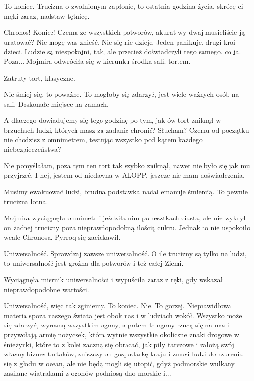\ds{} To koniec. Trucizna o zwolnionym zapłonie, to ostatnia godzina życia, skrócę ci męki zaraz, nadstaw tętnicę. \de{}

\ds{} Chronos! Koniec! Czemu ze wszystkich potworów, akurat wy dwaj musieliście ją uratować? Nie mogę was znieść. Nic się nie dzieje. 
Jeden panikuje, drugi kroi dzieci.
Ludzie są niespokojni, tak, ale przecież doświadczyli tego samego, co ja.
Poza... \dm{} Mojmira odwróciła się w kierunku środka sali. \dm{} tortem. \de{}

\ds{} Zatruty tort, klasyczne. \de{}

\ds{} Nie śmiej się, to poważne. To mogłoby się zdarzyć, jest wiele ważnych osób na sali. Doskonałe miejsce na zamach. \de{}

\ds{} A dlaczego dowiadujemy się tego godzinę po tym, jak ów tort zniknął w brzuchach ludzi, których masz za zadanie chronić? Słucham? 
Czemu od początku nie chodzisz z omnimetrem, testując wszystko pod kątem każdego niebezpieczeństwa? \de{}

\ds{} Nie pomyślałam, poza tym ten tort tak szybko zniknął, nawet nie było się jak mu przyjrzeć. 
I hej, jestem od niedawna w ALOPP, jeszcze nie mam doświadczenia. \de{}

\ds{} Musimy ewakuować ludzi, brudna podstawka nadal emanuje śmiercią. To pewnie trucizna lotna. \de{}

Mojmira wyciągnęła omnimetr i jeździła nim po resztkach ciasta, ale nie wykrył on żadnej trucizny poza nieprawdopodobną ilością cukru.
Jednak to nie uspokoiło wcale Chronosa. Pyrroq się zaciekawił.

\ds{} Uniwersalność. Sprawdzaj zawsze uniwersalność. O ile trucizny są tylko na ludzi, to uniwersalność jest groźna dla potworów i też całej Ziemi. \de{}

Wyciągnęła miernik uniwersalności i wypuściła zaraz z ręki, gdy wskazał nieprawdopodobne wartości.

\ds{} Uniwersalność, więc tak zginiemy. To koniec. Nie. To gorzej. Nieprawidłowa materia spoza naszego świata jest obok nas i w ludziach wokół.
Wszystko może się zdarzyć, wyrosną wszystkim ogony, a potem te ogony rzucą się na nas i przywołają armię nożyczek, która wytnie wszystkie okoliczne znaki drogowe w śnieżynki, które to
z kolei zaczną się obracać, jak piły tarczowe i założą swój własny biznes tartaków, zniszczy on gospodarkę kraju i zmusi ludzi do rzucenia się z głodu w ocean, ale nie będą mogli się
utopić, gdyż podmorskie wulkany zasilane wiatrakami z ogonów podniosą dno morskie i... \de{}

